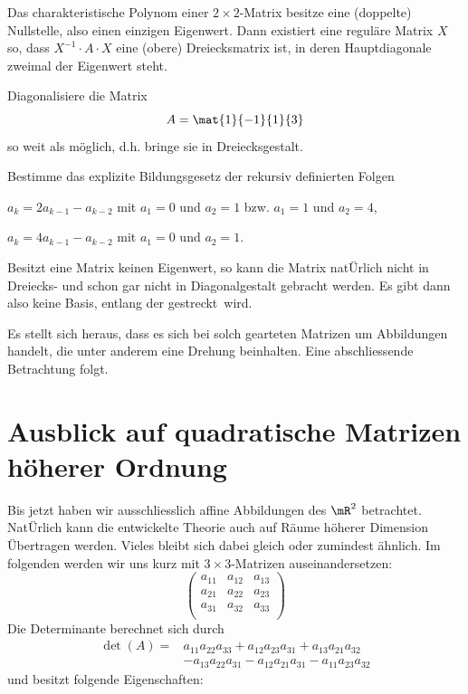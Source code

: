 \documentclass[%
11pt,%
twoside,%
titlepage,%
german,%
headsepline%
]{scrartcl}
\begin{document}
\begin{satz}
Das charakteristische Polynom einer $2 \times 2$-Matrix besitze eine (doppelte) Nullstelle, also einen einzigen Eigenwert. Dann existiert eine reguläre Matrix $X$ so, dass $X^{-1}\cdot A\cdot X$ eine (obere) Dreiecksmatrix ist, in deren Hauptdiagonale zweimal der Eigenwert steht.
\end{satz}

\begin{ueb}
Diagonalisiere die Matrix
$$A=\mat{1}{-1}{1}{3}$$
so weit als möglich, d.h. bringe sie in Dreiecksgestalt.
\end{ueb}

\begin{ueb}
Bestimme das explizite Bildungsgesetz der rekursiv definierten Folgen
\begin{enumeratea}
\item $a_k=2a_{k-1}-a_{k-2}$ mit $a_1=0$ und $a_2=1$ bzw. $a_1=1$ und $a_2=4$,
\item $a_k=4a_{k-1}-a_{k-2}$ mit $a_1=0$ und $a_2=1$.
\end{enumeratea}
\end{ueb}

\begin{bem}
Besitzt eine Matrix keinen Eigenwert, so kann die Matrix nat\"Urlich nicht in Dreiecks- und schon gar nicht in Diagonalgestalt gebracht werden. Es gibt dann also keine Basis, entlang der \glqq gestreckt\grqq\ wird.

Es stellt sich heraus, dass es sich bei solch gearteten Matrizen um Abbildungen handelt, die unter anderem eine Drehung beinhalten. Eine abschliessende Betrachtung folgt.
\end{bem}

\newpage

\appendix

\section{Ausblick auf quadratische Matrizen höherer Ordnung}

Bis jetzt haben wir ausschliesslich affine Abbildungen des $\mR^2$ betrachtet. Nat\"Urlich kann die entwickelte Theorie auch auf Räume höherer Dimension \"Ubertragen werden. Vieles bleibt sich dabei gleich oder zumindest ähnlich. Im folgenden werden wir uns kurz mit $3 \times 3$-Matrizen auseinandersetzen:
$$\begin{pmatrix}
a_{11}&a_{12}&a_{13}\\
a_{21}&a_{22}&a_{23}\\
a_{31}&a_{32}&a_{33}\\
\end{pmatrix}$$
Die Determinante berechnet sich durch
\begin{align*}
\det(A)=&a_{11}a_{22}a_{33}+a_{12}a_{23}a_{31}+a_{13}a_{21}a_{32}\\
&-a_{13}a_{22}a_{31}-a_{12}a_{21}a_{31}-a_{11}a_{23}a_{32}
\end{align*}
und besitzt folgende Eigenschaften:
\end{document}
